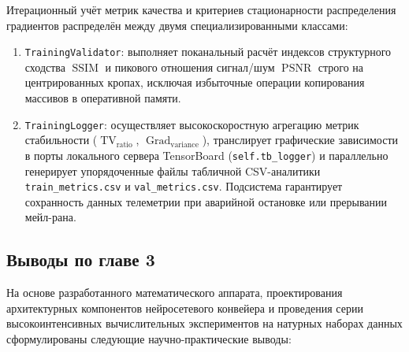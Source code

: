 \documentclass[12pt,a4paper]{article}
\begin{document}
Итерационный учёт метрик качества и критериев стационарности распределения градиентов распределён между двумя специализированными классами:
\begin{enumerate}
    \item \texttt{TrainingValidator}: выполняет поканальный расчёт индексов структурного сходства $\operatorname{SSIM}$ и пикового отношения сигнал/шум $\operatorname{PSNR}$ строго на центрированных кропах, исключая избыточные операции копирования массивов в оперативной памяти.
    \item \texttt{TrainingLogger}: осуществляет высокоскоростную агрегацию метрик стабильности ($\operatorname{TV}_{\operatorname{ratio}}$, $\operatorname{Grad}_{\operatorname{variance}}$), транслирует графические зависимости в порты локального сервера TensorBoard (\texttt{self.tb\_logger}) и параллельно генерирует упорядоченные файлы табличной CSV-аналитики \texttt{train\_metrics.csv} и \texttt{val\_metrics.csv}. Подсистема гарантирует сохранность данных телеметрии при аварийной остановке или прерывании мейл-рана.
\end{enumerate}

\subsection{Выводы по главе 3}

На основе разработанного математического аппарата, проектирования архитектурных компонентов нейросетевого конвейера и проведения серии высокоинтенсивных вычислительных экспериментов на натурных наборах данных сформулированы следующие научно-практические выводы:
\end{document}
